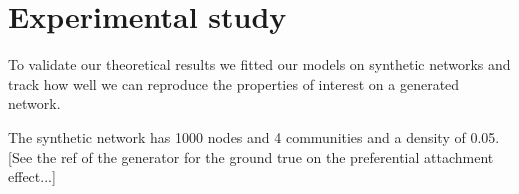 \section{Experimental study}

To validate our theoretical results we fitted our models on synthetic networks and track how well we can reproduce the properties of interest on a generated network.

The synthetic network has 1000 nodes and 4 communities and a density of 0.05. [See the ref of the generator for the ground true on the preferential attachment effect...]

%
%
%	
%
%
%	
%	
%
%
%
%
%
%
%
\clearpage
